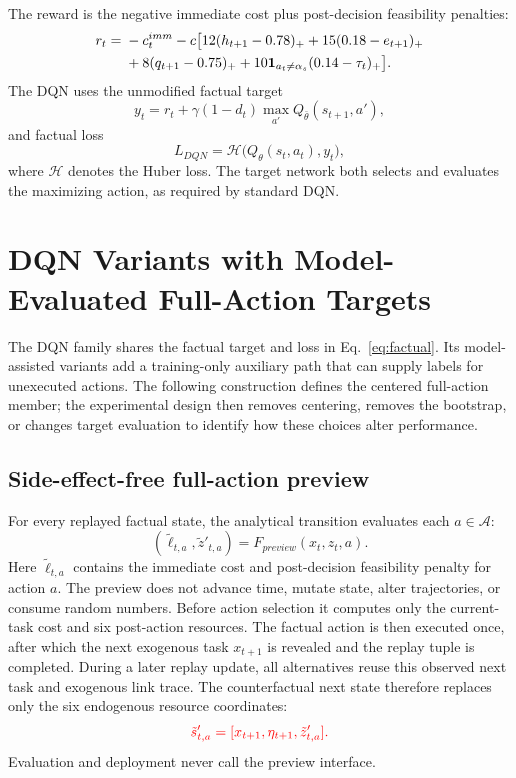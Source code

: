 \documentclass[11pt]{article}
\begin{document}
The reward is the negative immediate cost plus post-decision feasibility penalties:
\begin{align}
r_t={}&-c_t^{imm}-c\big[12(h_{t+1}-0.78)_+ +15(0.18-e_{t+1})_+\notag\\
&+8(q_{t+1}-0.75)_+ +10\mathbf 1_{a_t\ne\alpha_s}(0.14-\tau_t)_+\big].
\label{eq:reward}
\end{align}
The DQN uses the unmodified factual target
\begin{equation}
y_t=r_t+\gamma(1-d_t)\max_{a'}Q_{\bar\theta}(s_{t+1},a'),
\label{eq:factual}
\end{equation}
and factual loss
\begin{equation}
L_{DQN}=\mathcal H\big(Q_\theta(s_t,a_t),y_t\big),
\end{equation}
where $\mathcal H$ denotes the Huber loss. The target network both selects and evaluates the maximizing action, as required by standard DQN.

\color{red}%
\section{DQN Variants with Model-Evaluated Full-Action Targets}
\color{black}%
\label{sec:method}

\color{red}%
The DQN family shares the factual target and loss in Eq.~\eqref{eq:factual}. Its model-assisted variants add a training-only auxiliary path that can supply labels for unexecuted actions. The following construction defines the centered full-action member; the experimental design then removes centering, removes the bootstrap, or changes target evaluation to identify how these choices alter performance.
\color{black}%

\subsection{Side-effect-free full-action preview}

For every replayed factual state, the analytical transition evaluates each $a\in\mathcal A$:
\begin{equation}
(\tilde \ell_{t,a},\tilde z'_{t,a})=F_{preview}(x_t,z_t,a).
\end{equation}
Here $\tilde \ell_{t,a}$ contains the immediate cost and post-decision feasibility penalty for action $a$. The preview does not advance time, mutate state, alter trajectories, or consume random numbers. Before action selection it computes only the current-task cost and six post-action resources. The factual action is then executed once, after which the next exogenous task $x_{t+1}$ is revealed and the replay tuple is completed. During a later replay update, all alternatives reuse this observed next task and exogenous link trace. The counterfactual next state therefore replaces only the six endogenous resource coordinates:
\begin{equation}
\color{red}%
\tilde s'_{t,a}=[x_{t+1},\eta_{t+1},\tilde z'_{t,a}].
\color{black}%
\end{equation}
Evaluation and deployment never call the preview interface.
\end{document}
